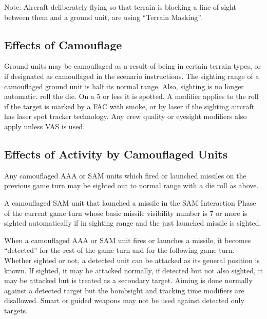 Note: Aircraft deliberately flying so that terrain is blocking a line of sight between them and a ground unit, are using “Terrain Masking”.

\subsection{Effects of Camouflage} Ground units may be camouflaged as a result of being in certain terrain types, or if designated as camouflaged in the scenario instructions. The sighting range of a camouflaged ground unit is half its normal range. Also, sighting is no longer automatic. 
%
roll the die. On a 5 or less it is spotted. A  modifier applies to the roll if the target is marked by a FAC with smoke, or by laser if the sighting aircraft has laser spot tracker technology. Any crew quality or eyesight modifiers also apply unless VAS is used. 

\subsection{Effects of Activity by Camouflaged Units}  Any camouflaged AAA or SAM units which fired or launched missiles on the previous game turn may be sighted out to normal range with a die roll as above.

A camouflaged SAM unit that launched a missile in the SAM Interaction Phase of the current game turn whose basic missile visibility number is 7 or more is sighted automatically if in sighting range and the just launched missile is sighted.

When a camouflaged AAA or SAM unit fires or launches a missile, it becomes “detected” for the rest of the game turn and for the following game turn. Whether sighted or not, a detected unit can be attacked as its general position is known. If sighted, it may be attacked normally, if detected but not also sighted, it may be attacked but is treated as a secondary target. Aiming is done normally against a detected target but the bombsight and tracking time modifiers are disallowed. Smart or guided weapons may not be used against detected only targets.

